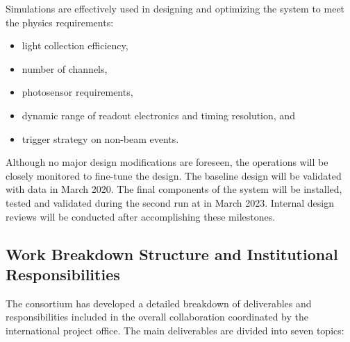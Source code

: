 Simulations are effectively used in designing and optimizing the \dual {} system to meet the physics requirements:
\begin{itemize}
\item light collection efficiency,
\item number of channels,
\item photosensor requirements,
\item dynamic range of readout electronics and timing resolution, and 
\item trigger strategy on non-beam events.
\end{itemize}

Although no major design modifications are foreseen, the  operations will be closely monitored to fine-tune the \dune \dual design. The baseline design will be validated with  data in March \num{2020}. The final components of the system will be installed, tested and validated during the second  run at  in March \num{2023}. Internal design reviews will be conducted after accomplishing these milestones.  

\subsection{Work Breakdown Structure and Institutional Responsibilities}

The \dual {} consortium has developed a detailed breakdown of deliverables and responsibilities  included in the overall  collaboration  %
coordinated by the international project office. The main deliverables are %
divided into seven topics: 

